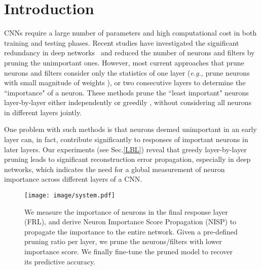 \documentclass[10pt,twocolumn,letterpaper]{article}
\def\eg{\emph{e.g.}}
\begin{document}
\section{Introduction}%
CNNs require a large number of parameters and high computational cost in both training and testing phases. 
Recent studies have investigated the significant redundancy in deep networks~\cite{PredictingParameters}%
and reduced the number of neurons and filters \cite{random,DeepCompress,pruneweigth,thinet} by pruning the unimportant ones.
However, most current approaches that prune neurons and filters consider only the statistics of one layer (\eg, prune neurons with small magnitude of weights \cite{pruneweigth,DeepCompress}), or two consecutive layers \cite{thinet} to determine the ``importance" of a neuron. These methods prune the ``least important" neurons layer-by-layer either independently \cite{DeepCompress} or greedily \cite{pruneweigth, thinet}, without considering all neurons in different layers jointly.

One problem with such methods is that neurons deemed unimportant in an early layer can, in fact, contribute significantly to responses of important neurons in later layers. Our experiments (see Sec.\ref{LBL}) reveal that greedy layer-by-layer pruning leads to significant reconstruction error propagation, especially in deep networks, which indicates the need for a global measurement of neuron importance across different layers of a CNN.

\begin{figure}[t]
\begin{center}
   \texttt{[image: image/system.pdf]}
\end{center}
   \caption{We measure the importance of neurons in the final response layer (FRL), and derive Neuron Importance Score Propagation (NISP) to propagate the importance to the entire network. Given a pre-defined pruning ratio per layer, we prune the neurons/filters with lower importance score. We finally fine-tune the pruned model to recover its predictive accuracy.}
\label{fig:spe}
\end{figure}
\end{document}
